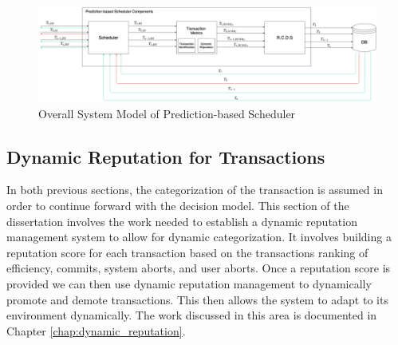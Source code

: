 \begin{figure}[h]
\captionsetup{justification=centering}
\centering
\includegraphics[width=\textwidth]{images/SystemModel_Overall}
\caption{Overall System Model of Prediction-based Scheduler}
\label{fig:system_model_overall}
\end{figure}

\subsection{Dynamic Reputation for Transactions}
In both previous sections, the categorization of the transaction is assumed in order to continue forward with the decision model. This section of the dissertation involves the work needed to establish a dynamic reputation management system to allow for dynamic categorization. It involves building a reputation score for each transaction based on the transactions ranking of efficiency, commits, system aborts, and user aborts. Once a reputation score is provided we can then use dynamic reputation management to dynamically promote and demote transactions. This then allows the system to adapt to its environment dynamically. The work discussed in this area is documented in Chapter \ref{chap:dynamic_reputation}.

